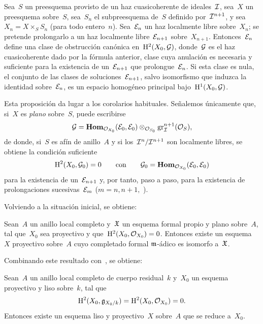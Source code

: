 
\begin{proposition}
\label{III.7.1}
Sea~$S$ un preesquema provisto de un haz cuasicoherente de ideales~$\cal{I}$, sea~$X$ un preesquema sobre~$S$, sea~$S_n$ el subpreesquema de~$S$ definido por~$\cal{I}^{n+1}$, y sea~$X_n=X\times_SS_n$ (para todo entero~$n$). Sea~$\cal{E}_n$ un haz localmente libre
sobre~$X_n$; se pretende prolongarlo a un haz localmente libre~$\cal{E}_{n+1}$ sobre~$X_{n+1}$. Entonces~$\cal{E}_n$ define una clase de obstrucción canónica en~$\H^2(X_0,\cal{G})$, donde~$\cal{G}$ es el haz cuasicoherente dado por la fórmula anterior, clase cuya anulación es necesaria y suficiente para la existencia de un~$\cal{E}_{n+1}$ que prolongue~$\cal{E}_n$. Si esta clase es nula, el conjunto de las clases de soluciones~$\cal{E}_{n+1}$, salvo isomorfismo que induzca la identidad sobre~$\cal{E}_n$, es un espacio homogéneo principal bajo~$\H^1(X_0,\cal{G})$.
\end{proposition}

Esta proposición da lugar a los corolarios habituales. Señalemos únicamente que, si~$X$ es \emph{plano} sobre~$S$, puede escribirse
$$
\cal{G}=\SheafHom_{\cal{O}_{X_0}}(\cal{E}_0,\cal{E}_0)
\otimes_{\cal{O}_{S_0}}\gr_{\cal{I}}^{n+1}(\cal{O}_S),
$$
de donde, si~$S$ es afín de anillo~$A$ y si los~$\cal{I}^n/\cal{I}^{n+1}$ son localmente libres, se obtiene la condición suficiente
$$
\H^2(X_0,\cal{G}_0)=0\qquad\text{con}\qquad
\cal{G}_0=\SheafHom_{\cal{O}_{X_0}}(\cal{E}_0,\cal{E}_0)
$$
para la existencia de un~$\cal{E}_{n+1}$ y, por tanto, paso a paso, para la existencia de prolongaciones sucesivas~$\cal{E}_m$ ($m=n,n+1,$
).

Volviendo a la situación inicial, se obtiene:

\begin{proposition}
\label{III.7.2}
Sean~$A$ un anillo local completo y~$\goth{X}$ un esquema formal propio y plano sobre~$A$, tal que~$X_0$ sea proyectivo y que~$\H^2(X_0,\cal{O}_{X_0})=0$. Entonces existe un esquema~$X$ proyectivo sobre~$A$ cuyo completado formal $\goth{m}$-ádico es isomorfo a~$\goth{X}$.
\end{proposition}

Combinando este resultado con~, se obtiene:

\begin{theoreme}
\label{III.7.3}
Sean~$A$ un anillo local completo de cuerpo residual~$k$ y~$X_0$ un esquema proyectivo y liso sobre~$k$, tal que
$$
\H^2(X_0,\goth{g}_{X_0/k})=\H^2(X_0,\cal{O}_{X_0})=0.
$$
Entonces existe un esquema liso y proyectivo~$X$ sobre~$A$ que se reduce a~$X_0$.
\end{theoreme}

